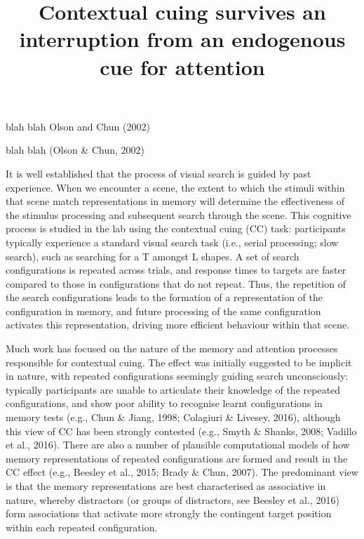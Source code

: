 \documentclass[
  man,
  floatsintext,
  longtable,
  nolmodern,
  notxfonts,
  notimes,
  colorlinks=true,linkcolor=blue,citecolor=blue,urlcolor=blue]{apa7}
\title{Contextual cuing survives an interruption from an endogenous cue
for attention}
\begin{document}
\maketitle


\setcounter{secnumdepth}{-\maxdimen} %

\setlength\LTleft{0pt}




blah blah Olson and Chun (2002)

blah blah (Olson \& Chun, 2002)

It is well established that the process of visual search is guided by
past experience. When we encounter a scene, the extent to which the
stimuli within that scene match representations in memory will determine
the effectiveness of the stimulus processing and subsequent search
through the scene. This cognitive process is studied in the lab using
the contextual cuing (CC) task: participants typically experience a
standard visual search task (i.e., serial processing; slow search), such
as searching for a T amongst L shapes. A set of search configurations is
repeated across trials, and response times to targets are faster
compared to those in configurations that do not repeat. Thus, the
repetition of the search configurations leads to the formation of a
representation of the configuration in memory, and future processing of
the same configuration activates this representation, driving more
efficient behaviour within that scene.

Much work has focused on the nature of the memory and attention
processes responsible for contextual cuing. The effect was initially
suggested to be implicit in nature, with repeated configurations
seemingly guiding search unconsciously: typically participants are
unable to articulate their knowledge of the repeated configurations, and
show poor ability to recognise learnt configurations in memory tests
(e.g., Chun \& Jiang, 1998; Colagiuri \& Livesey, 2016), although this
view of CC has been strongly contested (e.g., Smyth \& Shanks, 2008;
Vadillo et al., 2016). There are also a number of plausible
computational models of how memory representations of repeated
configurations are formed and result in the CC effect (e.g., Beesley et
al., 2015; Brady \& Chun, 2007). The predominant view is that the memory
representations are best characterised as associative in nature, whereby
distractors (or groups of distractors, see Beesley et al., 2016) form
associations that activate more strongly the contingent target position
within each repeated configuration.
\end{document}
